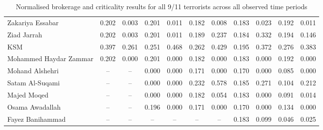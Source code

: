 \begin{subappendices}
\begin{table}
\begin{center}
\begin{tabular}{l cc cccccccc}
Zakariya Essabar       & 0.202     & 0.003       & 0.201     & 0.011       & 0.182     & 0.008        & 0.183     & 0.023       & 0.192            & 0.011            \\
Ziad Jarrah            & 0.202     & 0.003       & 0.201     & 0.011       & 0.189     & 0.237        & 0.184     & 0.332       & 0.194            & 0.146            \\
KSM                    & 0.397     & 0.261       & 0.251     & 0.468       & 0.262     & 0.429        & 0.195     & 0.372       & 0.276            & 0.383            \\
Mohammed Haydar Zammar & 0.202     & 0.000       & 0.201     & 0.000       & 0.182     & 0.000        & 0.183     & 0.000       & 0.192            & 0.000            \\
Mohand Alshehri        & --        & --          & 0.000     & 0.000       & 0.171     & 0.000        & 0.170     & 0.000       & 0.085            & 0.000            \\
Satam Al-Suqami        & --        & --          & 0.000     & 0.000       & 0.232     & 0.578        & 0.185     & 0.271       & 0.104            & 0.212            \\
Majed Moqed            & --        & --          & 0.000     & 0.000       & 0.182     & 0.054        & 0.183     & 0.000       & 0.091            & 0.014            \\
Osama Awadallah        & --        & --          & 0.196     & 0.000       & 0.171     & 0.000        & 0.170     & 0.000       & 0.134            & 0.000            \\
Fayez Banihammad       & --        & --          & --        & --          & --        & --           & 0.183     & 0.099       & 0.046            & 0.025            \\
\bottomrule
\end{tabular}
\end{center}
\caption{Normalised brokerage and criticality results for all 9/11 terrorists across all observed time periods}
\label{allterrorists}
\end{table}

\end{subappendices}